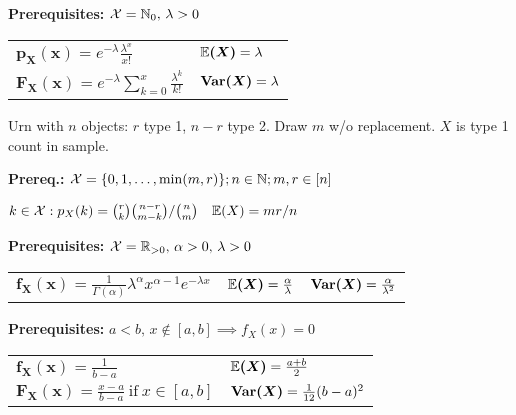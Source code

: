 \begin{ddefinition*}
  \textbf{Prerequisites:} \(\operatorname{\mathcal{X}} = \mathbb{N}_0, \, \lambda > 0\) \\
  \begin{tabularx}{\linewidth}{@{}ll@{}}
    \(\bm{p_X(x)} = e^{-\lambda}\frac{\lambda^x}{x!}\) & \(\bm{\mathbb{E}(X)} = \lambda\) \\
    \(\bm{F_X(x)} = e^{-\lambda} \sum\limits_{k=0}^x \frac{\lambda^k}{k!}\) & \(\bm{\Var(X)} = \lambda\)
  \end{tabularx}
\end{ddefinition*}

\begin{ddefinition*}
  Urn with \(n\) objects: \(r\) type 1, \(n-r\) type 2. Draw \(m\) w/o replacement. \(X\) is type 1 count in sample.
  
  \textbf{Prereq.:} \(\operatorname{\mathcal{X}} = \{0, 1, \ldots, \min(m, r)\}; n \in \mathbb{N};m, r \in [n]\)
  \begin{center}
    \(k \in \operatorname{\mathcal{X}}: p_X(k) = \binom{r}{k} \binom{n - r}{m - k}/{\binom{n}{m}} \quad \mathbb{E}(X) = m r / n\)
  \end{center}
\end{ddefinition*}

\pagebreak
\begin{cdefinition*}
  \textbf{Prerequisites:} \(\operatorname{\mathcal{X}} = \mathbb{R}_{>0}, \, \alpha > 0, \, \lambda > 0\) \\
  \begin{tabularx}{\linewidth}{@{}lll@{}}
    \(\bm{f_X(x)} = \frac{1}{\Gamma(\alpha)} \lambda^\alpha x^{\alpha - 1}e^{-\lambda x}\) & \(\bm{\mathbb{E}(X)} = \frac{\alpha}{\lambda}\) & \(\bm{\Var(X)} = \frac{\alpha}{\lambda^2}\)
  \end{tabularx}
\end{cdefinition*}

\begin{cdefinition*}
  \textbf{Prerequisites:} \(a < b, \, x \notin [a, b] \implies f_X(x) = 0\) \\
  \begin{tabularx}{\linewidth}{@{}ll@{}}
    \(\bm{f_X(x)} = \frac{1}{b-a}\) & \(\bm{\mathbb{E}(X)} = \frac{a + b}{2}\) \\
    \(\bm{F_X(x)} = \frac{x - a}{b - a} \ \text{if} \ x \in [a, b]\) & \(\bm{\Var(X)} = \frac{1}{12}(b - a)^2\)
  \end{tabularx}
\end{cdefinition*}

